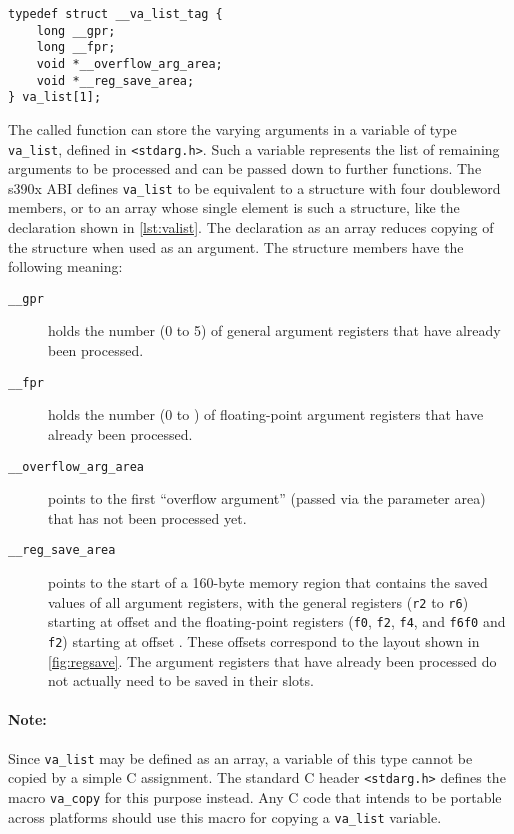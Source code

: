 \documentclass[english,11pt,twoside,toc=bib,toc=idx]{scrreprt}
\newcommand{\STACKSIZE}{160}
\newcommand{\ABINAME}{s390x}
\newcommand{\STACKSIZE}{96}
\newcommand{\ABINAME}{s390}
\begin{document}
\begin{lstlisting}[style=float,caption={\texttt{va\_list}
    declaration example},label={lst:valist}]
typedef struct __va_list_tag {
    long __gpr;
    long __fpr;
    void *__overflow_arg_area;
    void *__reg_save_area;
} va_list[1];
\end{lstlisting}

The called function can store the varying arguments in a variable of type
\texttt{va\_list}, defined in \texttt{<stdarg.h>}.  Such a variable
represents the list of remaining arguments to be processed and can be
passed down to further functions.  The \ABINAME{} ABI defines
\texttt{va\_list} to be equivalent to a structure with four {\ifzseries
  double\fi}word members, or to an array whose single element is such a
structure, like the declaration shown in \cref{lst:valist}.  The
declaration as an array reduces copying of the structure when used as an
argument.  The structure members have the following meaning:

\begin{description}
\item[\texttt{\_\_gpr}] holds the number (0 to 5) of general argument
  registers that have already been processed.
\item[\texttt{\_\_fpr}] holds the number (0 to {\fi})
  of floating-point argument registers that have already been processed.
\item[\texttt{\_\_overflow\_arg\_area}] points to the first ``overflow
  argument'' (passed via the parameter area) that has not been processed
  yet.
\item[\texttt{\_\_reg\_save\_area}] points to the start of a
  \STACKSIZE{}-byte memory region that contains the saved values of all
  argument registers, with the general registers (\texttt{r2} to
  \texttt{r6}) starting at offset {\fi} and the
  floating-point registers ({\ifzseries\texttt{f0}, \texttt{f2},
    \texttt{f4}, and \texttt{f6}\else \texttt{f0} and \texttt{f2}\fi})
  starting at offset {\fi}.  These offsets
  correspond to the layout shown in \cref{fig:regsave}.  The argument
  registers that have already been processed do not actually need to be
  saved in their slots.
\end{description}

\paragraph{Note:}
Since \texttt{va\_list} may be defined as an array, a variable of this
type cannot be copied by a simple C assignment.  The standard C header
\texttt{<stdarg.h>} defines the macro \texttt{va\_copy} for this purpose
instead.  Any C code that intends to be portable across platforms should
use this macro for copying a \texttt{va\_list} variable.
\end{document}

